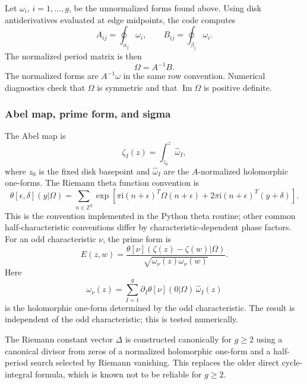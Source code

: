 \documentclass[11pt]{article}
\numberwithin{equation}{section}
\newcommand{\bZ}{\mathbb Z}
\newcommand{\ii}{\mathrm i}
\newcommand{\im}{\operatorname{Im}}
\newcommand{\wh}{\widehat}
\begin{document}
Let \(\omega_i\), \(i=1,\ldots,g\), be the unnormalized forms found above.
Using disk antiderivatives evaluated at edge midpoints, the code computes
\begin{equation}
        A_{ij}=\oint_{\alpha_j}\omega_i,
        \qquad
        B_{ij}=\oint_{\beta_j}\omega_i.
\end{equation}
The normalized period matrix is then
\begin{equation}
        \Omega=A^{-1}B.
        \label{eq:periodmatrix}
\end{equation}
The normalized forms are \(A^{-1}\omega\) in the same row convention.  Numerical
diagnostics check that \(\Omega\) is symmetric and that \(\im\Omega\) is
positive definite.

\subsubsection{Abel map, prime form, and sigma}

The Abel map is
\begin{equation}
        \zeta_I(z)=\int_{z_0}^{z}\wh\omega_I,
\end{equation}
where \(z_0\) is the fixed disk basepoint and \(\wh\omega_I\) are the
\(A\)-normalized holomorphic one-forms.  The Riemann theta function convention
is
\begin{equation}
        \theta[\epsilon,\delta](y|\Omega)
        =
        \sum_{n\in\bZ^g}
        \exp\left[
        \pi\ii(n+\epsilon)^T\Omega(n+\epsilon)
        +2\pi\ii(n+\epsilon)^T(y+\delta)
        \right].
\end{equation}
This is the convention implemented in the Python theta routine; other common
half-characteristic conventions differ by characteristic-dependent phase
factors.
For an odd characteristic \(\nu\), the prime form is
\begin{equation}
        E(z,w)
        =
        \frac{\theta[\nu](\zeta(z)-\zeta(w)|\Omega)}
        {\sqrt{\omega_\nu(z)\omega_\nu(w)}}.
        \label{eq:primeform}
\end{equation}
Here
\begin{equation}
        \omega_\nu(z)
        =
        \sum_{I=1}^g
        \partial_I\theta[\nu](0|\Omega)\,\wh\omega_I(z)
\end{equation}
is the holomorphic one-form determined by the odd characteristic.
The result is independent of the odd characteristic; this is tested
numerically.

The Riemann constant vector \(\Delta\) is constructed canonically for
\(g\geq2\) using a canonical divisor from zeros of a normalized holomorphic
one-form and a half-period search selected by Riemann vanishing.  This replaces
the older direct cycle-integral formula, which is known not to be reliable for
\(g\geq2\).
\end{document}
